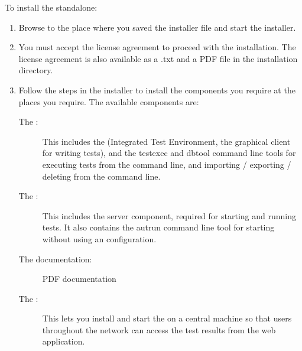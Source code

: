 To install the standalone:

\begin{enumerate}
\item Browse to the place where you saved the installer file and start the installer.
\item You must accept the license agreement to proceed with the installation. The license agreement is also available as a .txt and a PDF file in the installation directory.
\item Follow the steps in the installer to install the components you require at the places you require. The available components are:
\begin{description}
\item [The \ite{}:]{This includes the \ite{} (Integrated Test Environment, the graphical client for writing tests), and the testexec and dbtool command line tools for executing tests from the command line, and importing / exporting / deleting \gdprojects{} from the command line.}
\item [The \gdagent{}:]{This includes the server component, required for starting \gdauts{} and running tests. It also contains the autrun command line tool for starting \gdauts{} without using an \gdaut{} configuration.}
\item [The documentation:]{PDF documentation}
\item [The \dash{}:]{This lets you install and start the \dash{} on a central machine so that users throughout the network can access the test results from the web application. }
\end{description}
\end{enumerate}
